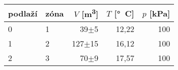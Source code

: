 \begin{tabular}{llrrr}
\toprule
podlaží & zóna& $V$ [\si{m^3}]& $T$ [\si{\degree C}]& $p$ [\si{kPa}] \\
\midrule
0 &1&         39$\pm$5    & 12,22& 100 \\
1 &2&       127$\pm$15    & 16,12& 100 \\
2 &3&         70$\pm$9    & 17,57& 100 \\
\bottomrule
\end{tabular}
